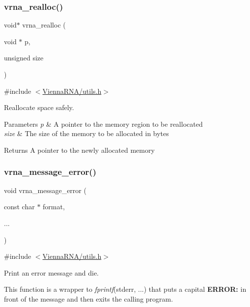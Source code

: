 \subsubsection{\texorpdfstring{vrna\+\_\+realloc()}{vrna\_realloc()}}
{\footnotesize\ttfamily void$\ast$ vrna\+\_\+realloc (\begin{DoxyParamCaption}\item[{void $\ast$}]{p,  }\item[{unsigned}]{size }\end{DoxyParamCaption})}



{\ttfamily \#include $<$\hyperlink{utils_8h}{Vienna\+R\+N\+A/utils.\+h}$>$}



Reallocate space safely. 


\begin{DoxyParams}{Parameters}
{\em p} & A pointer to the memory region to be reallocated \\
\hline
{\em size} & The size of the memory to be allocated in bytes \\
\hline
\end{DoxyParams}
\begin{DoxyReturn}{Returns}
A pointer to the newly allocated memory 
\end{DoxyReturn}
\mbox{\label{group__utils_ga36b35be01d7f36cf7f59c245eee628d1}} 
\subsubsection{\texorpdfstring{vrna\+\_\+message\+\_\+error()}{vrna\_message\_error()}}
{\footnotesize\ttfamily void vrna\+\_\+message\+\_\+error (\begin{DoxyParamCaption}\item[{const char $\ast$}]{format,  }\item[{}]{... }\end{DoxyParamCaption})}



{\ttfamily \#include $<$\hyperlink{utils_8h}{Vienna\+R\+N\+A/utils.\+h}$>$}



Print an error message and die. 

This function is a wrapper to {\itshape fprintf}(stderr, ...) that puts a capital {\bfseries E\+R\+R\+OR\+:} in front of the message and then exits the calling program.


